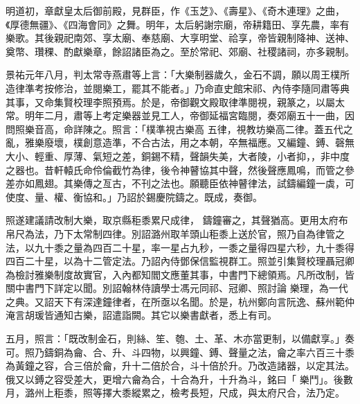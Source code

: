 \begin{pinyinscope}
 明道初，章獻皇太后御前殿，見群臣，作《玉芝》、《壽星》、《奇木連理》之曲，《厚德無疆》、《四海會同》之舞。明年，太后躬謝宗廟，帝耕籍田、享先農，率有樂歌。其後親祀南郊、享太廟、奉慈廟、大享明堂、祫享，帝皆親制降神、送神、
 奠幣、瓚稞、酌獻樂章，餘詔諸臣為之。至於常祀、郊廟、社稷諸祠，亦多親制。



 景祐元年八月，判太常寺燕肅等上言：「大樂制器歲久，金石不調，願以周王樸所造律準考按修治，並閱樂工，罷其不能者。」乃命直史館宋祁、內侍李隨同肅等典其事，又命集賢校理李照預焉。於是，帝御觀文殿取律準閱視，親篆之，以屬太常。明年二月，肅等上考定樂器並見工人，帝御延福宮臨閱，奏郊廟五十一曲，因問照樂音高，命詳陳之。照言：「樸準視古樂高
 五律，視教坊樂高二律。蓋五代之亂，雅樂廢壞，樸創意造準，不合古法，用之本朝，卒無福應。又編鐘、鎛、磬無大小、輕重、厚薄、氣短之差，銅錫不精，聲韻失美，大者陵，小者抑，，非中度之器也。昔軒轅氏命伶倫截竹為律，後令神瞽協其中聲，然後聲應鳳鳴，而管之參差亦如鳳翅。其樂傳之亙古，不刊之法也。願聽臣依神瞽律法，試鑄編鐘一虡，可使度、量、權、衡協和。」乃詔於錫慶院鑄之。既成，奏御。



 照遂建議請改制大樂，取京縣秬黍累尺成律，
 鑄鐘審之，其聲猶高。更用太府布帛尺為法，乃下太常制四律。別詔潞州取羊頭山秬黍上送於官，照乃自為律管之法，以九十黍之量為四百二十星，率一星占九秒，一黍之量得四星六秒，九十黍得四百二十星，以為十二管定法。乃詔內侍鄧保信監視群工。照並引集賢校理聶冠卿為檢討雅樂制度故實官，入內都知閻文應董其事，中書門下總領焉。凡所改制，皆關中書門下詳定以聞。別詔翰林侍讀學士馮元同祁、冠卿、照討論
 樂理，為一代之典。又詔天下有深達鐘律者，在所亟以名聞。於是，杭州鄭向言阮逸、蘇州範仲淹言胡瑗皆通知古樂，詔遣詣闕。其它以樂書獻者，悉上有司。



 五月，照言：「既改制金石，則絲、笙、匏、土、革、木亦當更制，以備獻享。」奏可。照乃鑄銅為龠、合、升、斗四物，以興鐘、鎛、聲量之法，龠之率六百三十黍為黃鐘之容，合三倍於龠，升十二倍於合，斗十倍於升。乃改造諸器，以定其法。俄又以鎛之容受差大，更增六龠為合，十合為升，十升為斗，銘曰「
 樂鬥」。後數月，潞州上秬黍，照等擇大黍縱累之，檢考長短，尺成，與太府尺合，法乃定。




\end{pinyinscope}
